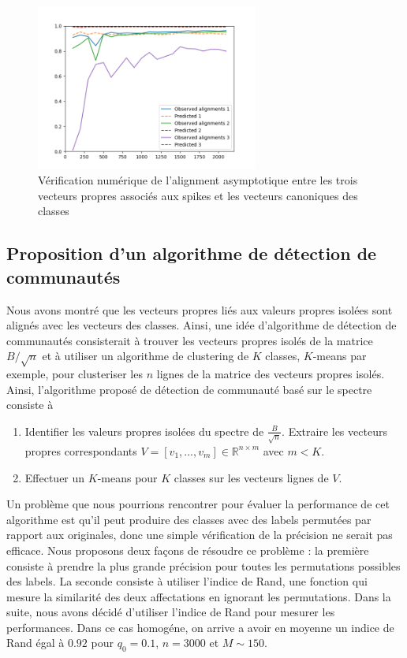 \documentclass[../../main.tex]{subfiles} %
\begin{document}
\begin{figure}
	\centering
	\includegraphics[width=0.65\textwidth]{../../images/cas_homogene/align_asymp/M_1000.png}
	\caption{Vérification numérique de l'alignment asymptotique entre les 
	trois vecteurs propres associés aux spikes et les vecteurs canoniques 
des classes}
	\label{fig:align_asymp}
\end{figure}

\subsection{Proposition d'un algorithme de détection de communautés}

Nous avons montré que les vecteurs propres liés aux valeurs propres isolées sont
alignés avec les vecteurs des classes. Ainsi, une idée d'algorithme de détection
de communautés consisterait à trouver les vecteurs propres isolés de la matrice
$B/\sqrt{n}$ et à utiliser un algorithme de clustering de $K$ classes, $K$-means
par exemple, pour clusteriser les $n$ lignes de la matrice des vecteurs propres
isolés. Ainsi, l'algorithme proposé de détection de communauté basé sur le
spectre consiste à
\begin{enumerate}
    \item Identifier les valeurs propres isolées du spectre de
	    $\frac{B}{\sqrt{n}}$. Extraire les vecteurs propres correspondants
	    $V = [v_1, ..., v_m] \in \mathbb{R}^{n \times m}$ avec $m < K$.
    \item Effectuer un $K$-means pour $K$ classes sur les vecteurs lignes de $V$.
\end{enumerate}
Un problème que nous pourrions rencontrer pour évaluer la performance de cet
algorithme est qu'il peut produire des classes avec des labels permutées par
rapport aux originales, donc une simple vérification de la précision ne serait
pas efficace. Nous proposons deux façons de résoudre ce problème : la première 
consiste à prendre la plus grande précision pour toutes les permutations 
possibles des labels. La seconde consiste à utiliser l'indice de Rand, une 
fonction qui mesure la similarité des deux affectations en ignorant les 
permutations. Dans la suite, nous avons décidé d'utiliser l'indice de Rand pour
mesurer les performances. Dans ce cas homogéne, on arrive a avoir en moyenne un
indice de Rand égal à $0.92$ pour $q_0 = 0.1$, $n= 3000$ et $M \sim 150$.
\end{document}
